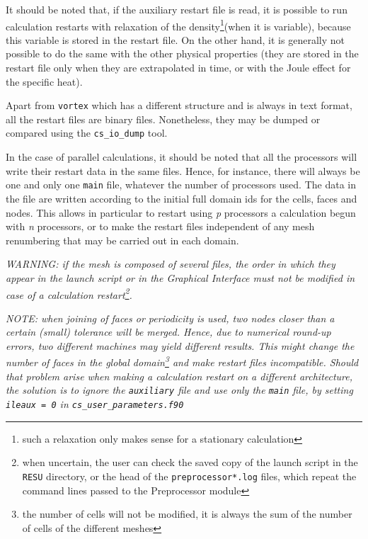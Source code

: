 {{{It should be noted that, if the auxiliary restart file is read, it is
possible to run calculation restarts with relaxation of the
density\footnote{such a relaxation only makes sense for a stationary
calculation}(when it is variable), because this variable is stored in the
restart file. On the other hand, it is generally not possible to do the
same with the other physical properties (they are stored in the restart
file only when they are extrapolated in time, or with the Joule effect for the
specific heat).

Apart from \texttt{vortex} which has a different structure and is
always in text format, all the restart files are binary
files. Nonetheless, they may be dumped or compared using
the \texttt{cs\_io\_dump} tool.

In the case of parallel calculations, it should be noted that all the processors
will write their restart data in the same files. Hence, for instance, there will
always be one and only one \texttt{main} file, whatever the number of
processors used. The data in the file are written according to the initial full
domain ids for the cells, faces and nodes. This allows in particular
to restart using {\it p} processors a calculation begun with {\it n} processors,
or to make the restart files independent of any mesh renumbering that may
be carried out in each domain.

{\em WARNING: if the mesh is composed of several files, the order
in which they appear in the launch script or in the Graphical Interface must not
be modified in case of a calculation restart\footnote{when uncertain, the user
can check the saved copy of the launch script in the \texttt{RESU} directory, or
the head of the \texttt{preprocessor*.log} files, which repeat the
command lines passed to the Preprocessor module}.}

{\em NOTE: when joining of faces or periodicity is used, two nodes closer
than a certain (small) tolerance will be merged. Hence, due to numerical
round-up errors, two different machines may yield different results.
This might change the number of faces in the global
domain\footnote{the number of cells will not be modified, it is always the sum of the
number of cells of the different meshes} and make restart files
incompatible. Should that problem arise when making a calculation restart on a
different architecture, the solution is to ignore the \texttt{auxiliary}
file and use only the \texttt{main} file, by setting \texttt{ileaux = 0}
in \texttt{cs\_user\_parameters.f90}}

}}}
